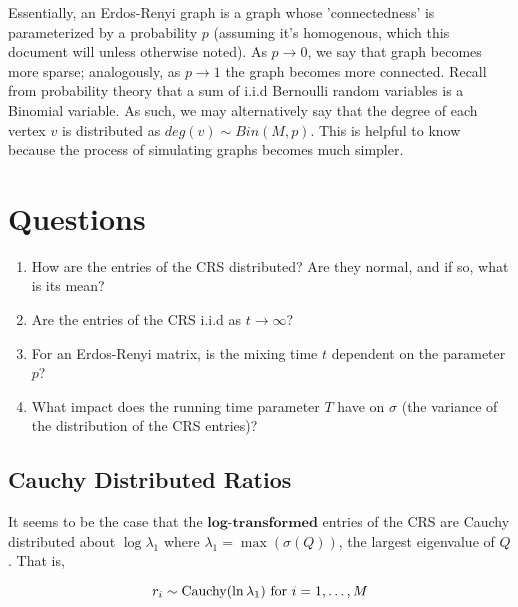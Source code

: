 Essentially, an Erdos-Renyi graph is a graph whose 'connectedness' is parameterized by a probability $p$ (assuming it's homogenous, which this document will unless otherwise noted). As $p \to 0$, we say that graph becomes more sparse; analogously, as $p \to 1$ the graph becomes more connected.\newline
\indent Recall from probability theory that a sum of i.i.d Bernoulli random variables is a Binomial variable. As such, we may alternatively say that the degree of each vertex $v$ is distributed as $deg(v) \sim Bin(M,p)$. This is helpful to know because the process of simulating graphs becomes much simpler.

\newpage


\section{Questions}

\begin{enumerate}
  \item How are the entries of the CRS distributed? Are they normal, and if so, what is its mean?
  \item Are the entries of the CRS i.i.d as $t \to \infty$?
  \item For an Erdos-Renyi matrix, is the mixing time $t$ dependent on the parameter $p$?
  \item What impact does the running time parameter $T$ have on $\sigma$ (the variance of the distribution of the CRS entries)? 
\end{enumerate}

\subsection{Cauchy Distributed Ratios}

It seems to be the case that the $\textbf{log-transformed}$ entries of the CRS are Cauchy distributed about $\log{\lambda_1}$ where $\lambda_1 = \max(\sigma(Q))$, the largest eigenvalue of $Q$. That is,

$$r_i \sim \text{Cauchy}(\ln\lambda_1) \text{ for } i = \oneto[M]$$